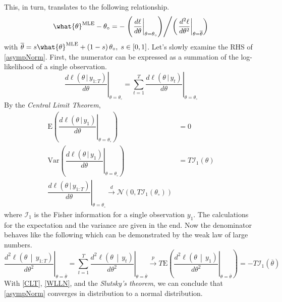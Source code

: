\documentclass[answers]{exam}
\begin{document}
\begin{questions}
\begin{solution}
\begin{enumerate}[a)]
\begin{itemize}
      This, in turn, translates to the following relationship.
      \begin{equation}\label{asympNorm}
        \what{\theta}^{\text{MLE}}-\theta_{\circ} =-\left.\left(\left.\dfrac{d\ell}{d\theta}\right|_{\theta=\theta_{\circ}}\right)\middle/\left(\left.\dfrac{d^{2}\ell}{d\theta^{2}}\right|_{\theta=\overline{\theta}}\right)\right.
      \end{equation}
      with $\overline{\theta} = s\what{\theta}^{\text{MLE}}+\left(1-s\right)\theta_{\circ},\; s\in\left[0,1\right]$. Let's slowly examine the RHS of \ref{asympNorm}. First, the numerator can be expressed as a summation of the log-likelihood of a single observation.
      \begin{equation}
        \left.\dfrac{d\ell\left(\theta\,|\,y_{1:T}\right)}{d\theta}\right|_{\theta=\theta_{\circ}} = \sum_{t=1}^{T}\left.\dfrac{d\ell\left(\theta\,|\,y_{t}\right)}{d\theta}\right|_{\theta=\theta_{\circ}}
      \end{equation}
      By the \emph{Central Limit Theorem},
      \begin{align}\label{CLT}
        \mathrm{E}\left(\left.\dfrac{d\ell\left(\theta\,|\,y_{1}\right)}{d\theta}\right|_{\theta=\theta_{\circ}}\right) &= 0\\
        \mathrm{Var}\left(\left.\dfrac{d\ell\left(\theta\,|\,y_{1}\right)}{d\theta}\right|_{\theta=\theta_{\circ}}\right) &= T\mathcal{I}_{1}\left(\theta\right)\\
        \left.\dfrac{d\ell\left(\theta\,|\,y_{1:T}\right)}{d\theta}\right|_{\theta=\theta_{\circ}} \xrightarrow{d} \mathcal{N}\left(0,T\mathcal{I}_{1}\left(\theta_{\circ}\right)\right)
      \end{align}
      where $\mathcal{I}_{1}$ is the Fisher information for a single observation $y_{1}$. The calculations for the expectation and the variance are given in the end. Now the denominator behaves like the following which can be demonstrated by the weak law of large numbers.
      \begin{equation}\label{WLLN}
        \left.\dfrac{d^{2}\ell\left(\theta\,\middle|\,y_{1:T}\right)}{d\theta^{2}}\right|_{\theta=\overline{\theta}}=\sum_{t=1}^{T}\left.\dfrac{d^{2}\ell\left(\theta\,\middle|\,y_{t}\right)}{d\theta^{2}}\right|_{\theta=\overline{\theta}} \xrightarrow{p} T\mathrm{E}\left(\left.\dfrac{d^{2}\ell\left(\theta\,\middle|\,y_{1}\right)}{d\theta^{2}}\right|_{\theta=\overline{\theta}} \right) =-T\mathcal{I}_{1}\left(\overline{\theta}\right)
      \end{equation}
      With \ref{CLT}, \ref{WLLN}, and the \emph{Slutsky's theorem}, we can conclude that \ref{asympNorm} converges in distribution to a normal distribution.

\end{itemize}
\end{enumerate}
\end{solution}
\end{questions}
\end{document}
